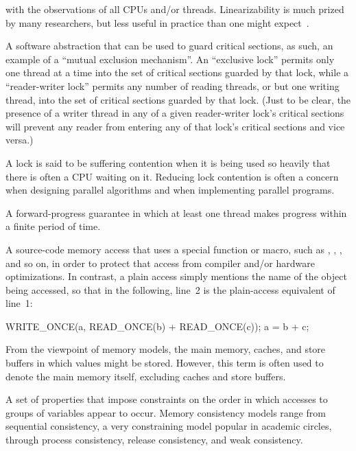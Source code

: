 \begin{description}
	with the observations of all CPUs and/or threads.
	Linearizability is much prized by many researchers, but less
	useful in practice than one might
	expect~\cite{AndreasHaas2012FIFOisnt}.
\item[\IX{Lock}:]
	A software abstraction that can be used to guard critical sections,
	as such, an example of a ``mutual exclusion mechanism''.
	An ``exclusive lock'' permits only one thread at a time into the
	set of critical sections guarded by that lock, while a
	``reader-writer lock'' permits any number of reading
	threads, or but one writing thread, into the set of critical
	sections guarded by that lock.
	(Just to be clear, the presence	of a writer thread in any of
	a given reader-writer lock's critical sections will prevent
	any reader from entering any of that lock's critical sections
	and vice versa.)
\item[\IX{Lock Contention}:]
	A lock is said to be suffering contention when it is being
	used so heavily that there is often a CPU waiting on it.
	Reducing lock contention is often a concern when designing
	parallel algorithms and when implementing parallel programs.
\item[\IX{Lock Free}:]
	A forward-progress guarantee in which at least one thread makes
	progress within a finite period of time.
\item[\IX{Marked Access}:]
	A source-code memory access that uses a special function or
	macro, such as , ,
	, and so on, in order to protect that access
	from compiler and/or hardware optimizations.
	In contrast, a plain access simply mentions the name of
	the object being accessed, so that in the following, line~2
	is the plain-access equivalent of line~1:
	\begin{VerbatimN}
	WRITE_ONCE(a, READ_ONCE(b) + READ_ONCE(c));
	a = b + c;
	\end{VerbatimN}
\item[\IX{Memory}:]
	From the viewpoint of memory models, the main memory,
	caches, and store buffers in which values might be stored.
	However, this term is often used to denote the main memory
	itself, excluding caches and store buffers.
\item[\IX{Memory Consistency}:]
	A set of properties that impose constraints on the order in
	which accesses to groups of variables appear to occur.
	Memory consistency models range from sequential consistency,
	a very constraining model popular in academic circles, through
	process consistency, release consistency, and weak consistency.

\end{description}
